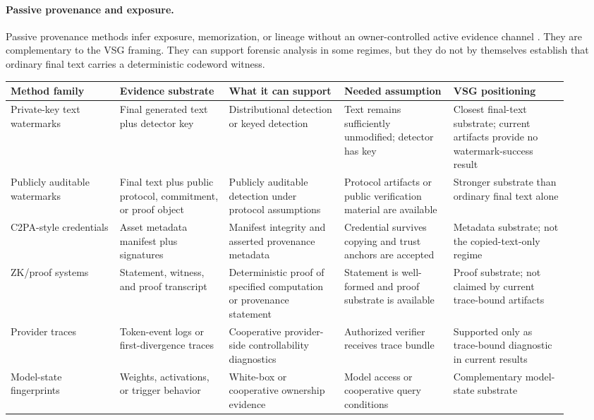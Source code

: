 \paragraph{Passive provenance and exposure.}
Passive provenance methods infer exposure, memorization, or lineage without an
owner-controlled active evidence channel
\cite{carlini2024stealing,liang2024model,xie2024recall,puerto2025scaling,ravichander2025imprint}.
They are complementary to the VSG framing.  They can support forensic analysis
in some regimes, but they do not by themselves establish that ordinary final
text carries a deterministic codeword witness.

\begin{table}[t]
\centering
\scriptsize
\setlength{\tabcolsep}{2pt}
\renewcommand{\arraystretch}{1.08}
\begin{tabular}{p{0.18\linewidth}p{0.18\linewidth}p{0.19\linewidth}p{0.18\linewidth}p{0.19\linewidth}}
\toprule
Method family & Evidence substrate & What it can support & Needed assumption & VSG positioning \\
\midrule
Private-key text watermarks & Final generated text plus detector key & Distributional detection or keyed detection & Text remains sufficiently unmodified; detector has key & Closest final-text substrate; current artifacts provide no watermark-success result \\
Publicly auditable watermarks & Final text plus public protocol, commitment, or proof object & Publicly auditable detection under protocol assumptions & Protocol artifacts or public verification material are available & Stronger substrate than ordinary final text alone \\
C2PA-style credentials & Asset metadata manifest plus signatures & Manifest integrity and asserted provenance metadata & Credential survives copying and trust anchors are accepted & Metadata substrate; not the copied-text-only regime \\
ZK/proof systems & Statement, witness, and proof transcript & Deterministic proof of specified computation or provenance statement & Statement is well-formed and proof substrate is available & Proof substrate; not claimed by current trace-bound artifacts \\
Provider traces & Token-event logs or first-divergence traces & Cooperative provider-side controllability diagnostics & Authorized verifier receives trace bundle & Supported only as trace-bound diagnostic in current results \\
Model-state fingerprints & Weights, activations, or trigger behavior & White-box or cooperative ownership evidence & Model access or cooperative query conditions & Complementary model-state substrate \\

\end{tabular}
\end{table}
